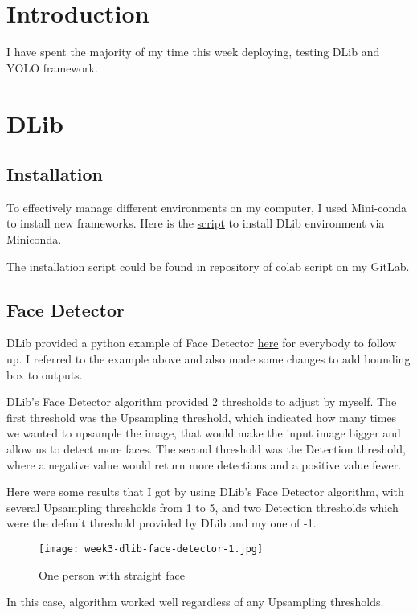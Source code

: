 \section{Introduction}
I have spent the majority of my time this week deploying, testing DLib\cite{dlib} and YOLO framework.

\section{DLib}
\subsection{Installation}
To effectively manage different environments on my computer, I used Mini-conda to install new frameworks. Here is the \href{https://raw.githubusercontent.com/tlvu2697/miniconda-scripts/master/dlib-setupenv.sh}{script} to install DLib environment via Miniconda.

The installation script could be found in repository of colab script on my GitLab.

\subsection{Face Detector}
DLib provided a python example of Face Detector \href{http://dlib.net/face_detector.py.html}{here} for everybody to follow up. I referred to the example above and also made some changes to add bounding box to outputs.

DLib's Face Detector algorithm provided 2 thresholds to adjust by myself. The first threshold was the Upsampling threshold, which indicated how many times we wanted to upsample the image, that would make the input image bigger and allow us to detect more faces. The second threshold was the Detection threshold, where a negative value would return more detections and a positive value fewer.

Here were some results that I got by using DLib's Face Detector algorithm, with several Upsampling thresholds from 1 to 5, and two Detection thresholds which were the default threshold provided by DLib and my one of -1.

\newpage
\begin{SCfigure}[0.5][!ht]
\caption{One person with straight face}
\texttt{[image: week3-dlib-face-detector-1.jpg]}
\end{SCfigure}
In this case, algorithm worked well regardless of any Upsampling thresholds.

